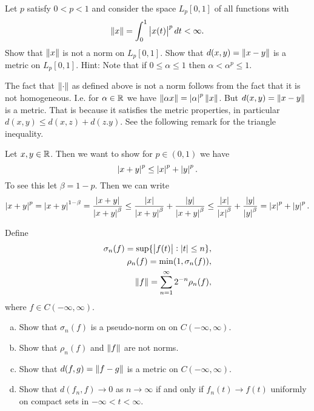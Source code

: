 \begin{problem}
	Let $ p $ satisfy $ 0<p<1 $ and consider the space $ L_p[0,1] $ of all functions with 
	\[ \norm{x} = \int_0^1 \left|x(t)\right|^p dt < \infty. \]
	Show that $ \norm{x} $ is not a norm on $ L_p[0,1] $. Show that $ d(x,y) = \norm{x-y} $ is a metric on $ L_p[0,1] $. Hint: Note that if $ 0\leq\alpha\leq 1 $ then $ \alpha<\alpha^p \leq 1 $.
\end{problem}
\begin{solution}
	The fact that $ \norm{\cdot} $ as defined above is not a norm follows from the fact that it is not homogeneous. I.e. for $ \alpha\in\mathbb{R} $  we have $ \norm{\alpha x} = \left|\alpha\right|^p \norm{x} $. But $ d(x,y) = \norm{x-y} $ is a metric. That is because it satisfies the metric properties, in particular $ d(x,y) \leq d(x,z) + d(z.y) $. See the following remark for the triangle inequality.
\end{solution}
\begin{remark}
	Let $ x,y\in \mathbb{R} $. Then we want to show for $ p\in (0,1) $ we have
	\[ \left|x+y\right|^p \leq \left|x\right|^p + \left|y\right|^p. \]
	To see this let $ \beta = 1-p $. Then we can write
	\[ \left|x+y\right|^p = \left|x+y\right|^{1-\beta} = \frac{\left|x+y\right|}{\left|x+y\right|^\beta} \leq \frac{\left|x\right|}{\left|x+y\right|^\beta} + \frac{\left|y\right|}{\left|x+y\right|^\beta} \leq \frac{\left|x\right|}{\left|x\right|^\beta} + \frac{\left|y\right|}{\left|y\right|^\beta} = \left|x\right|^p + \left|y\right|^p. \]
\end{remark}



\begin{problem}
	Define
	\begin{align*}
		\sigma_n(f) = \sup\{\left|f(t)\right|: \left|t\right|\leq n\}, \\
		\rho_n(f) = \min(1,\sigma_n(f)),\\
		\norm{f} = \sum_{n=1}^{\infty} 2^{-n}\rho_n(f),
	\end{align*}
	where $ f\in C(-\infty,\infty) $.
	
	\begin{enumerate}[(a)]
		\item Show that $ \sigma_n(f) $ is a pseudo-norm on on $ C(-\infty,\infty) $.
		\item Show that $ \rho_n(f) $ and $ \norm{f} $ are not norms.
		\item Show that $ d(f,g) = \norm{f-g} $ is a metric on $ C(-\infty,\infty) $.
		\item Show that $ d(f_n,f) \to 0 $ as $ n\to\infty $ if and only if $ f_n(t) \to f(t)$ uniformly on compact sets in $ -\infty<t<\infty $.
	\end{enumerate}
\end{problem}


